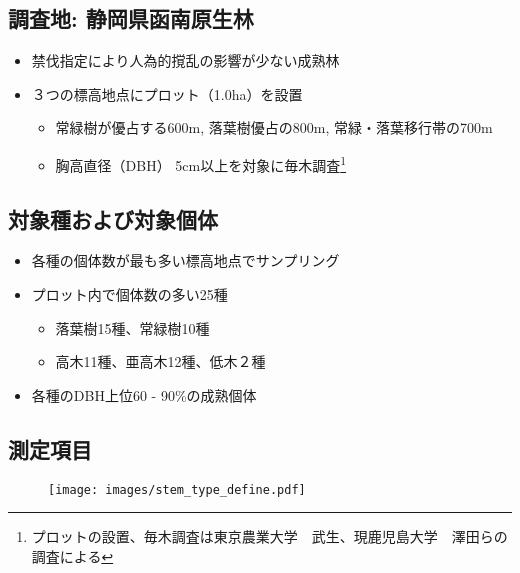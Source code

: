 \documentclass[a0, 30pt, plainboxedsections]{sciposter} %
\begin{document}
\begin{multicols}{3}\footnotesize{

\subsection*{\small{調査地: 静岡県函南原生林}}

\begin{itemize}\setlength{\itemindent}{1em}
  \item 禁伐指定により人為的撹乱の影響が少ない成熟林
  \item ３つの標高地点にプロット（1.0ha）を設置
  \begin{itemize}\setlength{\itemindent}{1em}
    \item 常緑樹が優占する600m, 落葉樹優占の800m, \newline 常緑・落葉移行帯の700m
    \item 胸高直径（DBH） 5cm以上を対象に毎木調査\footnote{プロットの設置、毎木調査は東京農業大学　武生、現鹿児島大学　澤田らの調査による}
  \end{itemize}
\end{itemize}

\subsection*{\small{対象種および対象個体}}

\begin{itemize}\setlength{\itemindent}{1em}
  \item 各種の個体数が最も多い標高地点でサンプリング
  \item プロット内で個体数の多い25種
  \begin{itemize}\setlength{\itemindent}{1em}
    \item 落葉樹15種、常緑樹10種
    \item 高木11種、亜高木12種、低木２種
  \end{itemize}
  \item 各種のDBH上位60 - 90\%の成熟個体
\end{itemize}

\columnbreak
\subsection*{\small{測定項目}}

\vspace{-1em}
\begin{figure}
	\centering
	\texttt{[image: images/stem\_type\_define.pdf]}
\end{figure}

}
\end{multicols}
\end{document}
